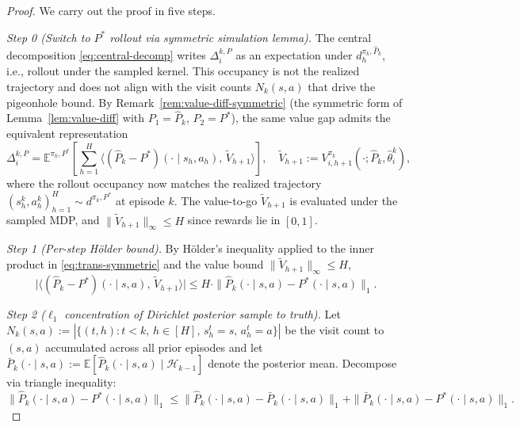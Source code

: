 \documentclass{article}
\begin{document}
\begin{proof}
We carry out the proof in five steps.

\textit{Step 0 (Switch to $P^*$ rollout via symmetric simulation lemma).} The central decomposition \eqref{eq:central-decomp} writes $\Delta_i^{k,P}$ as an expectation under $d_h^{\pi_k, \hat{P}_k}$, i.e., rollout under the sampled kernel. This occupancy is not the realized trajectory and does not align with the visit counts $N_k(s, a)$ that drive the pigeonhole bound. By Remark~\ref{rem:value-diff-symmetric} (the symmetric form of Lemma~\ref{lem:value-diff} with $P_1 = \hat{P}_k$, $P_2 = P^*$), the same value gap admits the equivalent representation
\begin{equation}
\label{eq:trans-symmetric}
\Delta_i^{k,P} = \mathbb{E}^{\pi_k, P^*}\left[\sum_{h=1}^H \big\langle (\hat{P}_k - P^*)(\cdot \mid s_h, a_h),\, \widetilde{V}_{h+1}\big\rangle\right], \quad \widetilde{V}_{h+1} := V_{i,h+1}^{\pi_k}(\cdot; \hat{P}_k, \hat{\theta}_i^k),
\end{equation}
where the rollout occupancy now matches the realized trajectory $(s_h^k, a_h^k)_{h=1}^H \sim d^{\pi_k, P^*}$ at episode $k$. The value-to-go $\widetilde{V}_{h+1}$ is evaluated under the sampled MDP, and $\|\widetilde{V}_{h+1}\|_\infty \leq H$ since rewards lie in $[0, 1]$.

\textit{Step 1 (Per-step Hölder bound).} By Hölder's inequality applied to the inner product in \eqref{eq:trans-symmetric} and the value bound $\|\widetilde{V}_{h+1}\|_\infty \leq H$,
\begin{equation}
\label{eq:step1-holder}
\big|\big\langle (\hat{P}_k - P^*)(\cdot \mid s, a),\, \widetilde{V}_{h+1}\big\rangle\big| \leq H \cdot \|\hat{P}_k(\cdot \mid s, a) - P^*(\cdot \mid s, a)\|_1.
\end{equation}

\textit{Step 2 ($\ell_1$ concentration of Dirichlet posterior sample to truth).} Let $N_k(s, a) := |\{(t, h) : t < k,\, h \in [H],\, s_h^t = s,\, a_h^t = a\}|$ be the visit count to $(s, a)$ accumulated across all prior episodes and let $\bar{P}_k(\cdot \mid s, a) := \mathbb{E}[\hat{P}_k(\cdot \mid s, a) \mid \mathcal{H}_{k-1}]$ denote the posterior mean. Decompose via triangle inequality:
\begin{equation}
\label{eq:triangle-decomp}
\|\hat{P}_k(\cdot \mid s, a) - P^*(\cdot \mid s, a)\|_1 \leq \|\hat{P}_k(\cdot \mid s, a) - \bar{P}_k(\cdot \mid s, a)\|_1 + \|\bar{P}_k(\cdot \mid s, a) - P^*(\cdot \mid s, a)\|_1.
\end{equation}


\end{proof}
\end{document}
